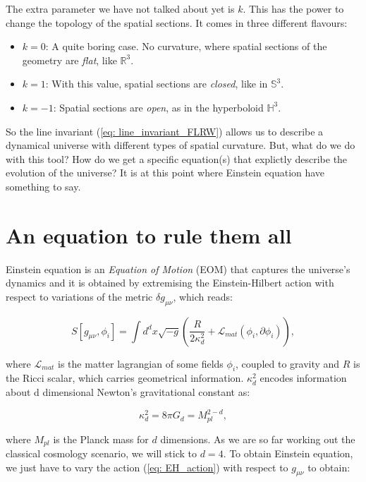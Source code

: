 \documentclass[11pt, a4paper]{article} %
\renewcommand{\it}{\textit}
\begin{document}
The extra parameter we have not talked about yet is $k$. This has the power to change the topology of the spatial sections. It comes in three different flavours:

\begin{itemize}
	\item $k = 0$: A quite boring case. No curvature, where spatial sections of the geometry are \it{flat}, like $\mathbb{R}^{3}$.
	\item $k = 1$: With this value, spatial sections are \it{closed}, like in $\mathbb{S}^{3}$.
	\item $k = -1$: Spatial sections are \it{open}, as in the hyperboloid $\mathbb{H}^{3}$.
\end{itemize}

So the line invariant (\ref{eq: line_invariant_FLRW}) allows us to describe a dynamical universe with different types of spatial curvature. But, what do we do with this tool? How do we get a specific equation(s) that explictly describe the evolution of the universe? It is at this point where Einstein equation have something to say.

\section*{An equation to rule them all}

Einstein equation is an \textit{Equation of Motion} (EOM) that captures the universe's dynamics and it is obtained by extremising the Einstein-Hilbert action with respect to variations of the metric $\delta g_{\mu\nu}$, which reads:

\begin{equation}\label{eq: EH_action}
	S[g_{\mu\nu}, \phi_{i}] = \int d^{d}x \sqrt{-g} \left(\frac{R}{2 \kappa^{2}_{d}} + \mathcal{L}_{mat}(\phi_{i}, \partial \phi_{i})\right), 
\end{equation}

where $\mathcal{L}_{mat}$ is the matter lagrangian of some fields $\phi_{i}$, coupled to gravity and $R$ is the Ricci scalar, which carries geometrical information. $\kappa^{2}_{d}$ encodes information about d dimensional Newton's gravitational constant as:

\begin{equation}
	\kappa^{2}_{d} = 8 \pi G_{d} = M_{pl}^{2-d},
\end{equation}

where $M_{pl}$ is the Planck mass for $d$ dimensions. As we are so far working out the classical cosmology scenario, we will stick to $d = 4$. To obtain Einstein equation, we just have to vary the action (\ref{eq: EH_action}) with respect to $g_{\mu \nu}$ to obtain:
\end{document}
